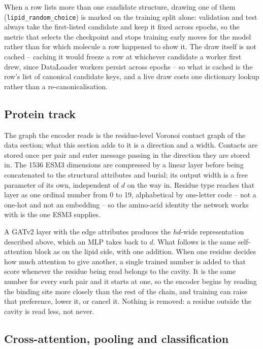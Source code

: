 When a row lists more than one candidate structure, drawing one of them
(\texttt{lipid\_random\_choice}) is marked on the training split alone: validation and
test always take the first-listed candidate and keep it fixed across epochs, so the
metric that selects the checkpoint and stops training early moves for the model rather
than for which molecule a row happened to show it. The draw itself is not cached --
caching it would freeze a row at whichever candidate a worker first drew, since
DataLoader workers persist across epochs -- so what is cached is the row's list of
canonical candidate keys, and a live draw costs one dictionary lookup rather than a
re-canonicalisation.

\subsection{Protein track}

The graph the encoder reads is the residue-level Voronoi contact graph of the data
section; what this section adds to it is a direction and a width. Contacts are stored
once per pair and enter message passing in the direction they are stored in. The 1536
ESM3 dimensions are compressed by a linear layer before being concatenated to the
structural attributes and burial; its output width is a free parameter of its own,
independent of $d$ on the way in. Residue type reaches that layer as one ordinal number
from 0 to 19, alphabetical by one-letter code -- not a one-hot and not an embedding -- so
the amino-acid identity the network works with is the one ESM3 supplies.

A GATv2 layer \cite{gatv2} with the edge attributes produces the $hd$-wide
representation described above, which an MLP takes back to $d$. What follows is the same
self-attention block as on the lipid side, with one addition. When one residue decides
how much attention to give another, a single trained number is added to that score
whenever the residue being read belongs to the cavity. It is the same number for every
such pair and it starts at one, so the encoder begins by reading the binding site more
closely than the rest of the chain, and training can raise that preference, lower it, or
cancel it. Nothing is removed: a residue outside the cavity is read less, not never.

\subsection{Cross-attention, pooling and classification}

